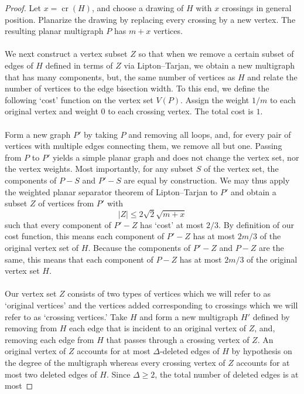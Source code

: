 \documentclass[11pt,a4paper]{amsart}
\theoremstyle{definition}
\theoremstyle{remark}
\DeclareMathOperator{\crn}{cr}
\begin{document}
\begin{proof}
Let $x=\crn(H)$, and choose a drawing of $H$ with $x$ crossings in general position.  Planarize the drawing by replacing every crossing by a new vertex.  The resulting planar multigraph $P$ has $m+x$ vertices.\\
\\
We next construct a vertex subset $Z$ so that when we remove a certain subset of edges of $H$ defined in terms of $Z$ via Lipton--Tarjan, we obtain a new multigraph that has many components, but, the same number of vertices as $H$ and relate the number of vertices to the edge bisection width.  To this end, we define the following `cost' function on the vertex set $V(P)$.  Assign the weight $1/m$ to each original vertex and weight $0$ to each crossing vertex.  The total cost is $1$.  \\
\\
Form a new graph $P'$ by taking $P$ and removing all loops, and, for every pair of vertices with multiple edges connecting them, we remove all but one.  Passing from $P$ to $P'$ yields a simple planar graph and does not change the vertex set, nor the vertex weights.  Most importantly, for any subset $S$ of the vertex set, the components of $P-S$ and $P'-S$ are equal by construction.  We may thus apply the weighted planar separator theorem of Lipton--Tarjan to $P'$ and obtain a subset $Z$ of vertices from $P'$ with
\begin{equation*}
        |Z|\le 2\sqrt{2} \sqrt{m+x}
\end{equation*}
such that every component of $P'-Z$ has `cost' at most $2/3$.  By definition of our cost function, this means each component of $P'-Z$ has at most $2m/3$ of the original vertex set of $H$.  Because the components of $P'-Z$ and $P-Z$ are the same, this means that each component of $P-Z$ has at most $2m/3$ of the original vertex set $H$.  \\
\\
Our vertex set $Z$ consists of two types of vertices which we will refer to as `original vertices' and the vertices added corresponding to crossings which we will refer to as `crossing vertices.'  Take $H$ and form a new multigraph $H'$ defined by removing from $H$ each edge that is incident to an original vertex of $Z$, and, removing each edge from $H$ that passes through a crossing vertex of $Z$.  An original vertex of $Z$ accounts for at most $\Delta$-deleted edges of $H$ by hypothesis on the degree of the multigraph whereas every crossing vertex of $Z$ accounts for at most two deleted edges of $H$.  Since $\Delta\ge 2$, the total number of deleted edges is at most

\end{proof}
\end{document}
